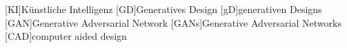 \begin{acronym}
  [KI]{Künstliche Intelligenz}
  [GD]{Generatives Design }
  [gD]{generativen Designs}
  [GAN]{Generative Adversarial Network}
  [GANs]{Generative Adversarial Networks}
  [CAD]{computer aided design}

\end{acronym}